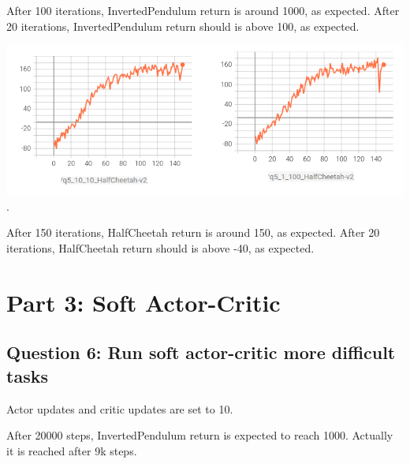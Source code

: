 \documentclass[11pt]{article}
\begin{document}
    After 100 iterations, InvertedPendulum return is around 1000, as expected.
    After 20 iterations, InvertedPendulum return should is above 100, as expected.

    \includegraphics[scale=2]{q5/q5_half_cheetah}.

    After 150 iterations, HalfCheetah return is around 150, as expected.
    After 20 iterations, HalfCheetah return should is above -40, as expected.

    \section{Part 3: Soft Actor-Critic}

    \subsection*{Question 6: Run soft actor-critic more difficult tasks}

    Actor updates and critic updates are set to 10.

    After 20000 steps, InvertedPendulum return is expected to reach 1000.
    Actually it is reached after 9k steps.
\end{document}
